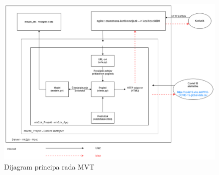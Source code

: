 		\begin{figure}[H]
						\includegraphics[width= 16 cm, height= 25 cm, keepaspectratio]{dijagrami/django_mvt.png} 
						\centering
						\caption{Dijagram principa rada MVT}
						\label{fig:dijagramRadaMVT}
					\end{figure}

		

				

